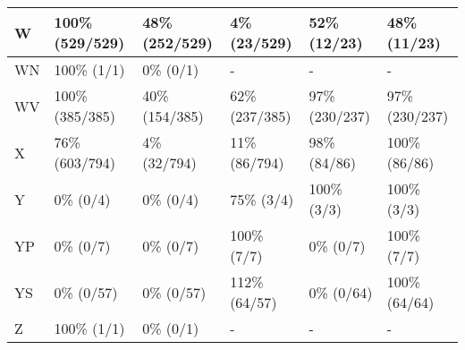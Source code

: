\begin{figure*}
\begin{tabular}{|l|l|l|l|l|l|}
\hline
W & 100\% (529/529) & 48\% (252/529) & 4\% (23/529) & 52\% (12/23) & 48\% (11/23) \\ 
\hline
WN & 100\% (1/1) & 0\% (0/1) & - & - & - \\ 
\hline
WV & 100\% (385/385) & 40\% (154/385) & 62\% (237/385) & 97\% (230/237) & 97\% (230/237) \\ 
\hline
X & 76\% (603/794) & 4\% (32/794) & 11\% (86/794) & 98\% (84/86) & 100\% (86/86) \\ 
\hline
Y & 0\% (0/4) & 0\% (0/4) & 75\% (3/4) & 100\% (3/3) & 100\% (3/3) \\ 
\hline
YP & 0\% (0/7) & 0\% (0/7) & 100\% (7/7) & 0\% (0/7) & 100\% (7/7) \\ 
\hline
YS & 0\% (0/57) & 0\% (0/57) & 112\% (64/57) & 0\% (0/64) & 100\% (64/64) \\ 
\hline
Z & 100\% (1/1) & 0\% (0/1) & - & - & - \\ 
\hline
\end{tabular}
\end{figure*}
